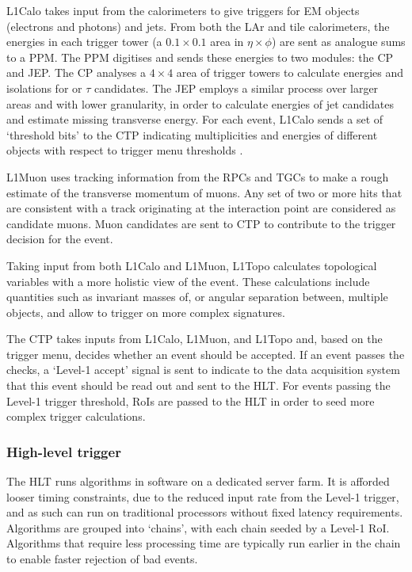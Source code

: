 L1Calo takes input from the calorimeters to give triggers for \ac{EM} objects
(electrons and photons) and jets. From both the \ac{LAr} and tile calorimeters,
the energies in each trigger tower (a $0.1\times0.1$ area in $\eta\times\phi$)
are sent as analogue sums to a \ac{PPM}. The \ac{PPM} digitises and sends these energies to two modules: the
\ac{CP} and \ac{JEP}. The \ac{CP} analyses a $4\times4$ area of trigger towers
to calculate energies and isolations for \egamma or $\tau$ candidates. The
\ac{JEP} employs a similar process over larger areas and with lower granularity,
in order to calculate energies of jet candidates and estimate missing transverse
energy. For each event, L1Calo sends a set of `threshold bits' to the \ac{CTP}
indicating multiplicities and energies of different objects with respect to
trigger menu thresholds \cite{Achenbach2008}.

L1Muon uses tracking information from the \acp{RPC} and \acp{TGC} to make a rough
estimate of the transverse momentum of muons. Any set of two or more hits that are
consistent with a track originating at the interaction point are considered as
candidate muons. Muon candidates are sent to \ac{CTP} to contribute to the
trigger decision for the event.

Taking input from both L1Calo and L1Muon, L1Topo calculates topological
variables with a more holistic view of the event. These calculations include
quantities such as invariant masses of, or angular separation between, multiple
objects, and allow to trigger on more complex signatures.

The \ac{CTP} takes inputs from L1Calo, L1Muon, and L1Topo and, based on the
trigger menu, decides whether an event should be accepted. If an event passes
the checks, a `Level-1 accept' signal is sent to indicate to the data
acquisition system that this event should be read out and sent to the \ac{HLT}.
For events passing the Level-1 trigger threshold, \acp{RoI} are passed to the
\ac{HLT} in order to seed more complex trigger calculations.

\subsubsection{High-level trigger}

The \ac{HLT} runs algorithms in software on a dedicated server farm. It is afforded
looser timing constraints, due to the reduced input rate from the Level-1 trigger,
and as such can run on traditional processors without fixed latency requirements.
Algorithms are grouped into `chains', with each chain seeded by a Level-1
\ac{RoI}. Algorithms that require less processing time are typically run earlier
in the chain to enable faster rejection of bad events.


